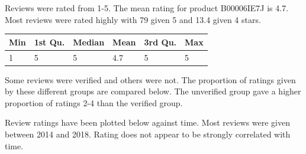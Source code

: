 \documentclass[
  11pt,
]{article}
\begin{document}
Reviews were rated from 1-5. The mean rating for product B00006IE7J is
4.7. Most reviews were rated highly with 79 given 5 and 13.4 given 4
stars.

\begin{longtable}[]{@{}llllll@{}}
\toprule
Min & 1st Qu. & Median & Mean & 3rd Qu. & Max \\
\midrule
\endhead
1 & 5 & 5 & 4.7 & 5 & 5 \\
\bottomrule
\end{longtable}

Some reviews were verified and others were not. The proportion of
ratings given by these different groups are compared below. The
unverified group gave a higher proportion of ratings 2-4 than the
verified group.

Review ratings have been plotted below against time. Most reviews were
given between 2014 and 2018. Rating does not appear to be strongly
correlated with time.
\end{document}
